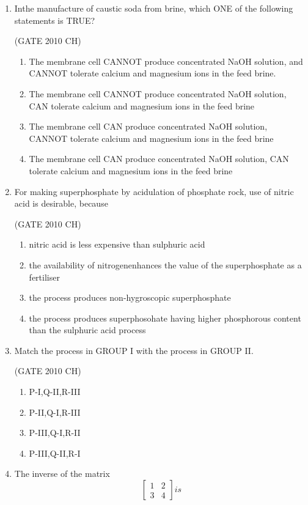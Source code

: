 \documentclass[journal,12pt,onecolumn]{exam}
\theoremstyle{remark}
\begin{document}
\begin{enumerate}
  \item 
   Inthe manufacture of caustic soda from brine, which ONE of the following statements is TRUE?
   
  \hfill{(GATE 2010 CH)}\\
   
   \begin{enumerate}
       \item The membrane cell CANNOT produce concentrated NaOH solution, and CANNOT tolerate calcium and magnesium ions in the feed brine.
       \item The membrane cell CANNOT produce concentrated NaOH solution, CAN tolerate calcium and magnesium ions in the feed brine
       \item  The membrane cell CAN produce concentrated NaOH solution, CANNOT tolerate calcium and magnesium ions in the feed brine 
       \item  The membrane cell CAN produce concentrated NaOH solution, CAN tolerate calcium and magnesium ions in the feed brine
   \end{enumerate}

   \item 
   For making superphosphate by acidulation of phosphate rock, use of nitric acid is desirable, because
   
\hfill{(GATE 2010 CH)}\\

   \begin{enumerate}
       \item nitric acid is less expensive than sulphuric acid
       \item the availability of nitrogenenhances the value of the superphosphate as a fertiliser
       \item the process produces non-hygroscopic superphosphate
       \item the process produces superphosohate having higher phosphorous content than the sulphuric acid process
   \end{enumerate}


 \item 
   Match the process in GROUP I with the process in GROUP II.

\hfill{(GATE 2010 CH)}\\
  
      

    \begin{enumerate}
        \item P-I,Q-II,R-III
        \item P-II,Q-I,R-III
        \item P-III,Q-I,R-II
        \item P-III,Q-II,R-I
    \end{enumerate}
\item 
 The inverse of the matrix \[
 \begin{bmatrix}
     1 & 2\\
     3 & 4
 \end{bmatrix}  is
 \] 
 

\end{enumerate}
\end{document}
